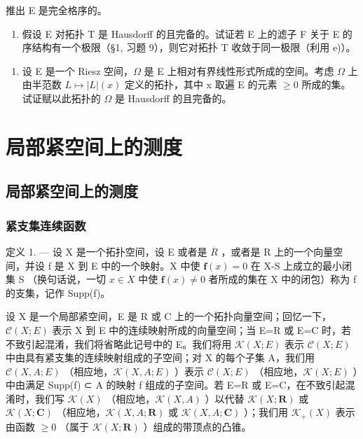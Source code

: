推出 E 是完全格序的。

\begin{enumerate}
\def\labelenumi{\alph{enumi})}
\setcounter{enumi}{5}
\tightlist
\item
  假设 E 对拓扑 T 是 Hausdorff 的且完备的。试证若 E 上的滤子 F 关于 E 的序结构有一个极限（§1, 习题 9），则它对拓扑 T 收敛于同一极限（利用 e)）。
\end{enumerate}

\begin{enumerate}
\def\labelenumi{\arabic{enumi})}
\setcounter{enumi}{8}
\tightlist
\item
  设 E 是一个 Riesz 空间，\(\Omega\) 是 E 上相对有界线性形式所成的空间。考虑 \(\Omega\) 上由半范数 \(L \mapsto |L|(x)\) 定义的拓扑，其中 x 取遍 E 的元素 \(\geqslant 0\) 所成的集。试证赋以此拓扑的 \(\Omega\) 是 Hausdorff 的且完备的。
\end{enumerate}

\chapter{局部紧空间上的测度}

\section{局部紧空间上的测度}

\subsection{紧支集连续函数}

定义 1. --- 设 X 是一个拓扑空间，设 E 或者是 \(\overline{R}\) ，或者是 R 上的一个向量空间，并设 f 是 X 到 E 中的一个映射。X 中使 \(\mathbf{f}(x)=0\) 在 X-S 上成立的最小闭集 S （换句话说，一切 \(x\in X\) 中使 \(\mathbf{f}(x)\neq0\) 者所成的集在 X 中的闭包）称为 f 的支集，记作 Supp(f)。

设 X 是一个局部紧空间，E 是 R 或 C 上的一个拓扑向量空间；回忆一下，\(\mathcal{C}(X;E)\) 表示 X 到 E 中的连续映射所成的向量空间；当 E=R 或 E=C 时，若不致引起混淆，我们将省略此记号中的 E。我们将用 \(\mathcal{K}(X;E)\) 表示 \(\mathcal{C}(X;E)\) 中由具有紧支集的连续映射组成的子空间；对 X 的每个子集 A，我们用 \(\mathcal{C}(X,A;E)\) （相应地，\(\mathcal{K}(X,A;E)\) ）表示 \(\mathcal{C}(X;E)\) （相应地，\(\mathcal{K}(X;E)\) ）中由满足 Supp(f) ⊂ A 的映射 f 组成的子空间。若 E=R 或 E=C，在不致引起混淆时，我们写 \(\mathcal{K}(X)\) （相应地，\(\mathcal{K}(X,A)\) ）以代替 \(\mathcal{K}(X;\mathbf{R})\) 或 \(\mathcal{K}(X;\mathbf{C})\) （相应地，\(\mathcal{K}(X,A;\mathbf{R})\) 或 \(\mathcal{K}(X,A;\mathbf{C})\) ）；我们用 \(\mathcal{K}_{+}(X)\) 表示由函数 \(\geqslant0\) （属于 \(\mathcal{K}(X;\mathbf{R})\) ）组成的带顶点的凸锥。

